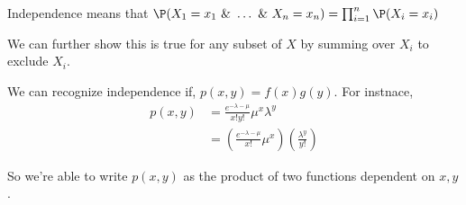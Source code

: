 \begin{remark}
	Independence means that $\P(X_{1} = x_{1} \text{ \& } \dots \text{ \& } X_n = x_n)  = \prod_{i = 1}^{n} \P(X_i = x_i)$

\vspace{1em}

We can further show this is true for any subset of $X$ by summing over $X_i$ to exclude $X_i$.

\vspace{1em}

We can recognize independence if, $p(x,y) = f(x)g(y)$. For instnace,
\begin{align*}
	p(x, y) &= \frac{e^{-\lambda - \mu}}{x! y!} \mu^{x} \lambda^{y}\\
		&= \left ( \frac{e^{-\lambda - \mu}}{x!} \mu^{x} \right ) \left ( \frac{\lambda^{y}}{y!} \right )
\end{align*}

So we're able to write $p(x,y)$ as the product of two functions dependent on $x,y$.

\end{remark}

